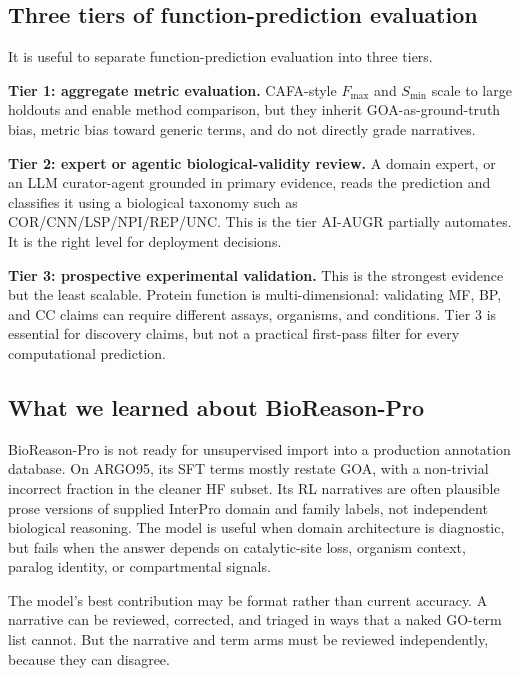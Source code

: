 \documentclass[
  11pt,
]{article}
\begin{document}
\hypertarget{three-tiers-of-function-prediction-evaluation}{%
\subsection{Three tiers of function-prediction
evaluation}\label{three-tiers-of-function-prediction-evaluation}}

It is useful to separate function-prediction evaluation into three
tiers.

\textbf{Tier 1: aggregate metric evaluation.} CAFA-style \(F_{\max}\)
and \(S_{\min}\) scale to large holdouts and enable method comparison,
but they inherit GOA-as-ground-truth bias, metric bias toward generic
terms, and do not directly grade narratives.

\textbf{Tier 2: expert or agentic biological-validity review.} A domain
expert, or an LLM curator-agent grounded in primary evidence, reads the
prediction and classifies it using a biological taxonomy such as
COR/CNN/LSP/NPI/REP/UNC. This is the tier AI-AUGR partially automates. It
is the right level for deployment decisions.

\textbf{Tier 3: prospective experimental validation.} This is the
strongest evidence but the least scalable. Protein function is
multi-dimensional: validating MF, BP, and CC claims can require
different assays, organisms, and conditions. Tier 3 is essential for
discovery claims, but not a practical first-pass filter for every
computational prediction.

\hypertarget{what-we-learned-about-bioreason-pro}{%
\subsection{What we learned about
BioReason-Pro}\label{what-we-learned-about-bioreason-pro}}

BioReason-Pro is not ready for unsupervised import into a production
annotation database. On ARGO95, its SFT terms mostly restate GOA, with
a non-trivial incorrect fraction in the cleaner HF subset. Its RL
narratives are often plausible prose versions of supplied InterPro
domain and family labels, not independent biological reasoning. The model
is useful when domain architecture is diagnostic, but fails when the answer depends on
catalytic-site loss, organism context, paralog identity, or
compartmental signals.

The model's best contribution may be format rather than current
accuracy. A narrative can be reviewed, corrected, and triaged in ways
that a naked GO-term list cannot. But the narrative and term arms must
be reviewed independently, because they can disagree.
\end{document}
